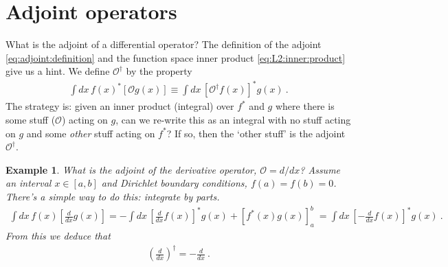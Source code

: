 \documentclass[
  11pt,
	colorful,
	raggedright,
]{tufte-style-thesis-flip}
\newtheorem{example}{Example}[section]
\begin{document}
\section{Adjoint operators}

What is the adjoint of a differential operator? The definition of the adjoint \eqref{eq:adjoint:definition} and the function space inner product \eqref{eq:L2:inner:product} give us a hint. We define $\mathcal O^\dag$ by the property
\begin{align}
  \int dx \, f(x)^* \left[\mathcal O g(x)\right]
  \equiv
  \int dx \, \left[\mathcal O^\dag f(x)\right]^*  g(x) \ .
\end{align}
The strategy is: given an inner product (integral) over $f^*$ and $g$ where there is some stuff ($\mathcal O$) acting on $g$, can we re-write this as an integral with no stuff acting on $g$ and some \emph{other} stuff acting on $f^*$? If so, then the `other stuff' is the adjoint $\mathcal O^\dag$.
\begin{example}
What is the adjoint of the derivative operator, $\mathcal O = d/dx$? Assume an interval $x\in[a,b]$ and Dirichlet boundary conditions, $f(a)=f(b)=0$. There's a simple way to do this: integrate by parts.
\begin{align}
  \int dx \,  f(x) \left[\frac{d}{dx} g(x)\right]
  =
  - \int dx \, \left[\frac{d}{dx}f(x)\right]^* g(x)
  +
  \left[f^*(x)g(x)\right]^b_a \ 
  =
  \int dx \, \left[-\frac{d}{dx}f(x)\right]^* g(x)
  \ . 
\end{align}
From this we deduce that
\begin{align}
  \left(\frac{d}{dx}\right)^\dag = -\frac{d}{dx} \ .
\end{align}
\end{example}
\end{document}
